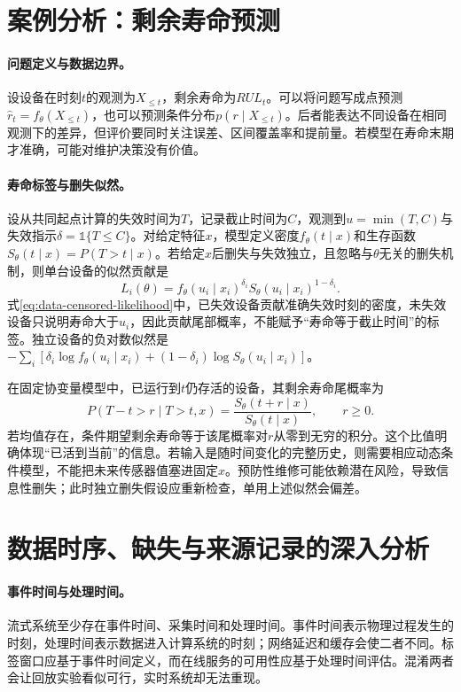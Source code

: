 \section{案例分析：剩余寿命预测}
\paragraph{问题定义与数据边界。}
设设备在时刻$t$的观测为$X_{\leq t}$，剩余寿命为$RUL_t$。可以将问题写成点预测$\hat r_t=f_\theta(X_{\leq t})$，也可以预测条件分布$p(r\mid X_{\leq t})$。后者能表达不同设备在相同观测下的差异，但评价要同时关注误差、区间覆盖率和提前量。若模型在寿命末期才准确，可能对维护决策没有价值。

\paragraph{寿命标签与删失似然。}
设从共同起点计算的失效时间为$T$，记录截止时间为$C$，观测到$u=\min(T,C)$与失效指示$\delta=\mathbb 1\{T\leq C\}$。对给定特征$x$，模型定义密度$f_\theta(t\mid x)$和生存函数$S_\theta(t\mid x)=P(T>t\mid x)$。若给定$x$后删失与失效独立，且忽略与$\theta$无关的删失机制，则单台设备的似然贡献是
\begin{equation}
 L_i(\theta)=f_\theta(u_i\mid x_i)^{\delta_i}
 S_\theta(u_i\mid x_i)^{1-\delta_i}.\label{eq:data-censored-likelihood}
\end{equation}
式\eqref{eq:data-censored-likelihood}中，已失效设备贡献准确失效时刻的密度，未失效设备只说明寿命大于$u_i$，因此贡献尾部概率，不能赋予“寿命等于截止时间”的标签。独立设备的负对数似然是$-\sum_i[\delta_i\log f_\theta(u_i\mid x_i)+(1-\delta_i)\log S_\theta(u_i\mid x_i)]$。

在固定协变量模型中，已运行到$t$仍存活的设备，其剩余寿命尾概率为
\begin{equation}
 P(T-t>r\mid T>t,x)=\frac{S_\theta(t+r\mid x)}{S_\theta(t\mid x)},\qquad r\geq0.
\end{equation}
若均值存在，条件期望剩余寿命等于该尾概率对$r$从零到无穷的积分。这个比值明确体现“已活到当前”的信息。若输入是随时间变化的完整历史，则需要相应动态条件模型，不能把未来传感器值塞进固定$x$。预防性维修可能依赖潜在风险，导致信息性删失；此时独立删失假设应重新检查，单用上述似然会偏差。

\section{数据时序、缺失与来源记录的深入分析}
\paragraph{事件时间与处理时间。}
流式系统至少存在事件时间、采集时间和处理时间。事件时间表示物理过程发生的时刻，处理时间表示数据进入计算系统的时刻；网络延迟和缓存会使二者不同。标签窗口应基于事件时间定义，而在线服务的可用性应基于处理时间评估。混淆两者会让回放实验看似可行，实时系统却无法重现。

